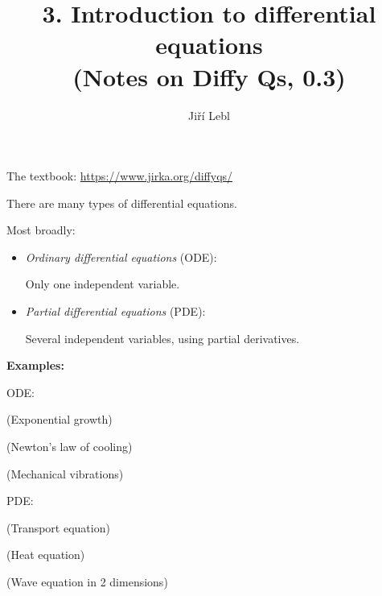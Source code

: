 \documentclass[10pt,aspectratio=169]{beamer}
\author{Ji\v{r}\'i Lebl}
\institute[OSU]{%
Oklahoma State University%
}
\title{3. Introduction to differential equations\\(Notes on Diffy Qs, 0.3)}
\date{}
\begin{document}
\begin{frame}
\titlepage


\begin{center}
The textbook: \url{https://www.jirka.org/diffyqs/}
\end{center}
\end{frame}

\begin{frame}
There are many types of differential equations.

\medskip
\pause

Most broadly:

\begin{itemize}
\item
\pause
\emph{Ordinary differential equations} (ODE):

Only one independent variable.
\item
\pause
\emph{Partial differential equations} (PDE):

Several independent variables, using partial derivatives.
\end{itemize}

\end{frame}

\begin{frame}

\textbf{Examples:}

\medskip

ODE:

\medskip
\pause

\quad{}\hspace*{2in}%
(Exponential growth)

\medskip
\pause

\quad{}\hspace*{2in}%
(Newton's law of cooling)

\medskip
\pause

\quad{}\hspace*{2in}%
(Mechanical vibrations)

\medskip
\pause

PDE:

\medskip
\pause

\quad{}\hspace*{2in}%
(Transport equation)

\medskip
\pause

\quad{}\hspace*{2in}%
(Heat equation)
\medskip
\pause

\quad{}\hspace*{2in}%
(Wave equation in 2 dimensions)

\end{frame}
\end{document}
